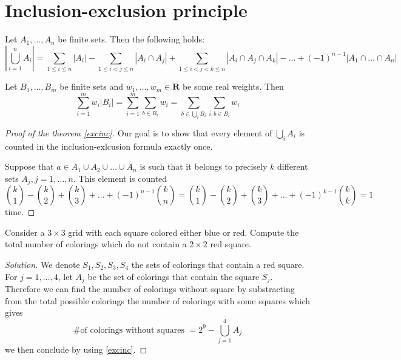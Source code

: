 \section{Inclusion-exclusion principle} 
\begin{theorem}\label{excinc}
Let $A_{1},\dots,A_{n}$ be finite sets. Then the following holds:
$$
\left|\bigcup _{i=1}^{n}A_{i}\right|=\sum_{1\le i\le n} |A_{i}|-\sum _{1\le i <j\le n}|A_{i}\cap A_{j}|+\sum _{1\le i<j<k\le n}|A_{i}\cap A_{j}\cap A_{k}|-\dots+(-1)^{n-1}|A_{1}\cap\dots \cap A_{n}|  
$$
\end{theorem}
\begin{lemma}
Let $B_{1},\dots,B_m$ be finite sets and $w_{1},\dots,w_{m}\in \mathbf{R}$ be some real weights. Then
$$
\sum_{i=1}^{m} w_{i}|B_{i}|=\sum_{i=1}^{m} \sum _{b\in B_{i}}w_{i}=\sum _{b\in \bigcup _{i}B_{i}}\sum _{i:b\in B_{i}}w_{i}
$$
\end{lemma}
\begin{proof}[Proof of the theorem \ref{excinc}]
Our goal is to show that every element of $\bigcup _{i}A_{i}$ is counted in the inclusion-exlcusion formula exactly once.

Suppose that $a\in A_{1}\cup A_{2}\cup\dots \cup A_{n}$ is such that it belongs to precisely $k$ different sets $A_{j},j=1,\dots,n$. This element is counted 
$$
\binom{k}{1}-\binom{k}{2}+\binom{k}{3}+\dots+(-1)^{n-1}\binom{k}{n}=\binom{k}{1}-\binom{k}{2}+\binom{k}{3}+\dots+(-1)^{k-1}\binom{k}{k}=1
$$
time.
\end{proof}
\begin{exercise}
Consider a $3\times3$ grid with each square colored either blue or red. Compute the total number of colorings which do not contain a $2\times 2$ red square.
\end{exercise}
\begin{proof}[Solution]
We denote $S_{1},S_{2},S_{3},S_{4}$ the sets of colorings that contain a red square. For $j=1,\dots,4$, let $A_{j}$ be the set of colorings that contain the square $S_{j}$. Therefore we can find the number of colorings without square by substracting from the total possible colorings the number of colorings with some squares which gives
$$
\text{\# of colorings without squares }=2^{9}-\bigcup _{j=1}^{4}A_{j}
$$
we then conclude by using \ref{excinc}.
\end{proof}
